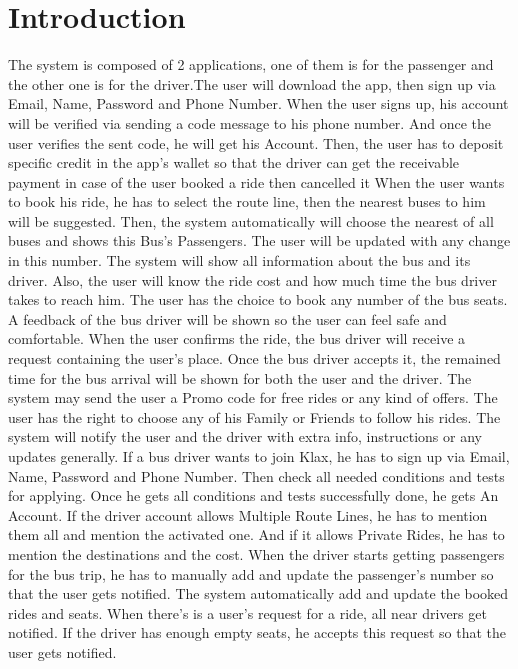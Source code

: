 \section{Introduction}
\hspace{2cm} The system is composed of 2 applications, one of them is for the passenger and the other one is for the driver.The user will download the app, then sign up via Email, Name, Password and Phone Number. When the user signs up, his account will be verified via sending a code message to his phone number. And once the user verifies the sent code, he will get his Account. Then, the user has to deposit specific credit in the app's wallet so that the driver can get the receivable payment in case of the user booked a ride then cancelled it
When the user wants to book his ride, he has to select the route line, then the nearest buses to him will be suggested. Then, the system automatically will choose the nearest of all buses and shows this Bus's Passengers. The user will be updated with any change in this number. The system will show all information about the bus and its driver. Also, the user will know the ride cost and how much time the bus driver takes to reach him. The user has the choice to book any number of the bus seats. A feedback of the bus driver will be shown so the user can feel safe and comfortable. When the user confirms the ride, the bus driver will receive a request containing the user's place. Once the bus driver accepts it, the remained time for the bus arrival will be shown for both the user and the driver. The system may send the user a Promo code for free rides or any kind of offers. The user has the right to choose any of his Family or Friends to follow his rides. The system will notify the user and the driver with extra info, instructions or any updates generally. \newline
If a bus driver wants to join Klax, he has to sign up via Email, Name, Password and Phone Number. Then check all needed conditions and tests for applying. Once he gets all conditions and tests successfully done, he gets An Account. If the driver account allows Multiple Route Lines, he has to mention them all and mention the activated one.
And if it allows Private Rides, he has to mention the destinations and the cost. When the driver starts getting passengers for the bus trip, he has to manually add and update the passenger’s number so that the user gets notified. The system automatically add and update the booked rides and seats. When there's is a user's request for a ride, all near drivers get notified. If the driver has enough empty seats, he accepts this request so that the user gets notified.
\newpage
